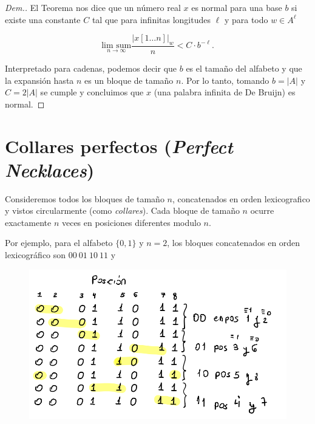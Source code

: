 \documentclass{report}
\theoremstyle{definition} %
\begin{document}
\begin{proof}[Dem.]
    El Teorema  nos dice que un número real $x$
    es normal para una base $b$ si existe una constante $C$ tal que para
    infinitas longitudes $\ell$ y para todo $w \in A^\ell$

    $$
        \underset{n \to \infty}{\text{lim sum}}
        \frac{|x[1\dots n]|_w}{n} < C \cdot b^{-\ell}.
    $$

    Interpretado para cadenas, podemos decir que $b$ es el tamaño del alfabeto y
    que la expansión hasta $n$ es un bloque de tamaño $n$. Por lo tanto, tomando
    $b = |A|$ y $C = 2|A|$ se cumple y concluimos que $x$ (una palabra infinita
    de De Bruijn) es normal.
\end{proof}

\section{Collares perfectos (\textit{Perfect Necklaces})}

Consideremos todos los bloques de tamaño $n$, concatenados en orden
lexicografico y vistos circularmente (como \textit{collares}). Cada bloque de
tamaño $n$ ocurre exactamente $n$ veces en posiciones diferentes modulo $n$.

Por ejemplo, para el alfabeto $\{0, 1\}$ y $n = 2$, los bloques concatenados en orden lexicográfico son $00\ 01\ 10\ 11$ y


\begin{figure}[H]
    \centering
    \includegraphics[scale=0.3]{img/2_perf-neckl-2.png}
\end{figure}
\end{document}
